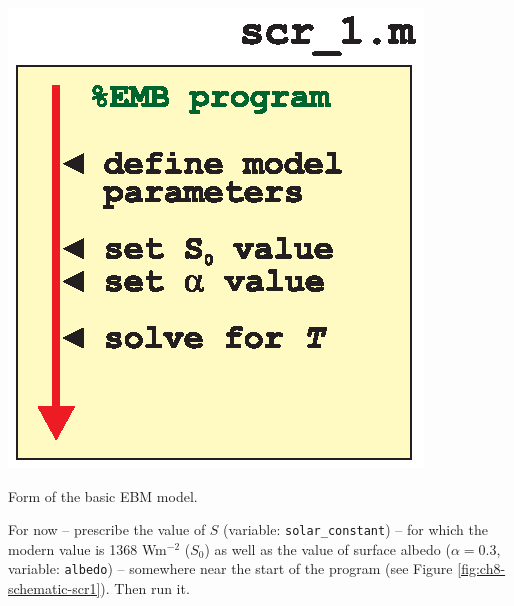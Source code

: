 \documentclass{tufte-book} %
\begin{document}
\begin{marginfigure}[0.0in]
\includegraphics[width=\linewidth]{ch8-schematic-scr1.eps}
\caption{Form of the basic EBM model.}
\label{fig:ch8-schematic-scr1}
\end{marginfigure}

For now -- prescribe the value of \(S\) (variable: \texttt{solar\_constant}) -- for which the modern value is 1368 Wm\(^{-2}\) (\(S_{0}\)) as well as the value of surface albedo (\(\alpha=0.3\), variable: \texttt{albedo}) -- somewhere near the start of the program (see Figure \ref{fig:ch8-schematic-scr1}). Then run it.
\end{document}
